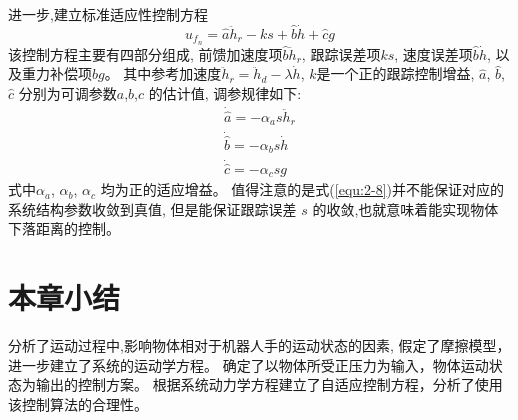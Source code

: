 进一步,建立标准适应性控制方程 \cite{ref10}
\begin{equation}
  {u_{{f_n}}} = \hat a{\ddot h_r} - ks + \hat b\dot h + \hat cg
  \label{equ:2-7}
\end{equation}
该控制方程主要有四部分组成,
前馈加速度项$\hat b{\ddot h_r}$, 跟踪误差项$ks$,
速度误差项$\hat b\dot h$, 以及重力补偿项$\hat bg$。
其中参考加速度${\ddot h_r} = {\ddot h_d} - \lambda \dot h$,
$k$是一个正的跟踪控制增益, $\hat a$, $\hat b$, $\hat c$ 分别为可调参数$a$,$b$,$c$ 的估计值, 调参规律如下:
\begin{equation}
  \label{equ:2-8}
  \begin{array}{l}
    \dot{\hat a} = - {\alpha _a}s{{\ddot h}_r}\\
    \dot{\hat b} = - {\alpha _b}s\dot h\\
    \dot{\hat c} = - {\alpha _c}sg
  \end{array}
\end{equation}
式中${\alpha _a}$, ${\alpha _b}$, ${\alpha _c}$ 均为正的适应增益。
值得注意的是式(\ref{equ:2-8})并不能保证对应的系统结构参数收敛到真值,
但是能保证跟踪误差 $s$ 的收敛,也就意味着能实现物体下落距离的控制。


\section{本章小结}
分析了运动过程中,影响物体相对于机器人手的运动状态的因素,
假定了摩擦模型，进一步建立了系统的运动学方程。
确定了以物体所受正压力为输入，物体运动状态为输出的控制方案。
根据系统动力学方程建立了自适应控制方程，分析了使用该控制算法的合理性。

